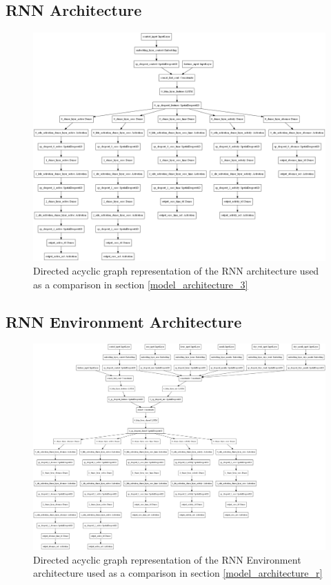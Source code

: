 \subsection{RNN Architecture}
\begin{figure}[H]
\centering
\includegraphics[width=\textwidth,height=0.8\textheight,keepaspectratio]{images/appendix_B/rnn_3.png}
\caption[\textbf{RNN DAG - Section \ref{model_architecture_3}}]{Directed acyclic graph representation of the RNN architecture used as a comparison in section \ref{model_architecture_3}}
\label{rnn_3_dag}
\end{figure}

\subsection{RNN Environment Architecture}
\begin{figure}[H]
\centering
\includegraphics[width=\textwidth,height=0.8\textheight,keepaspectratio]{images/appendix_B/rnn_env_3.png}
\caption[\textbf{RNN Environment DAG - Section \ref{model_architecture_3}}]{Directed acyclic graph representation of the RNN Environment architecture used as a comparison in section \ref{model_architecture_r}}
\label{rnn_env_dag}
\end{figure}

